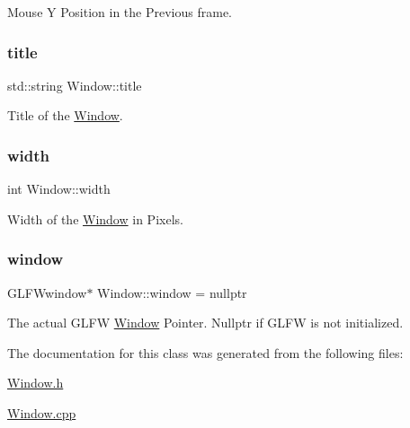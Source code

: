 Mouse Y Position in the Previous frame. 

\mbox{\label{class_window_accc3e5364fced57c273820aa51410e12}} 
\subsubsection{\texorpdfstring{title}{title}}
{\footnotesize\ttfamily std\+::string Window\+::title\hspace{0.3cm}{\ttfamily [protected]}}



Title of the \mbox{\hyperlink{class_window}{Window}}. 

\mbox{\label{class_window_af5b1c436782cc9752d386493fbc5dc8c}} 
\subsubsection{\texorpdfstring{width}{width}}
{\footnotesize\ttfamily int Window\+::width\hspace{0.3cm}{\ttfamily [protected]}}



Width of the \mbox{\hyperlink{class_window}{Window}} in Pixels. 

\mbox{\label{class_window_a9957db4afdad3d57e5c5b6626b44b6d0}} 
\subsubsection{\texorpdfstring{window}{window}}
{\footnotesize\ttfamily G\+L\+F\+Wwindow$\ast$ Window\+::window = nullptr\hspace{0.3cm}{\ttfamily [protected]}}



The actual G\+L\+FW \mbox{\hyperlink{class_window}{Window}} Pointer. Nullptr if G\+L\+FW is not initialized. 



The documentation for this class was generated from the following files\+:\begin{DoxyCompactItemize}
\item 
\mbox{\hyperlink{_window_8h}{Window.\+h}}\item 
\mbox{\hyperlink{_window_8cpp}{Window.\+cpp}}\end{DoxyCompactItemize}
